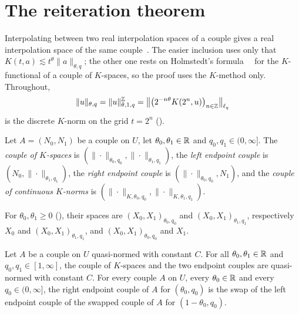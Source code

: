\section{The reiteration theorem}
\label{sec:reiteration}

Interpolating between two real interpolation spaces of a couple gives a real interpolation
space of the same couple~\cite[Theorems~3.5.3 and~3.11.5]{BerghLofstrom}. The easier inclusion
uses only that $K(t, a) \lesssim t^{\theta} \|a\|_{\theta, q}$; the other one rests on
Holmstedt's formula~\cite{Holmstedt}~\cite[Theorem~3.6.1]{BerghLofstrom} for the $K$-functional
of a couple of $K$-spaces, so the proof uses the $K$-method only. Throughout,
\[
  \|u\|_{\theta, q} = \|u\|^{\mathbb{Z}}_{\theta, 1, q}
  = \bigl\| \bigl(2^{-n\theta} K(2^n, u)\bigr)_{n \in \mathbb{Z}} \bigr\|_{\ell_q}
\]
is the discrete $K$-norm on the grid $t = 2^n$ ().

\begin{definition}
\label{def:k-space-couples}
\leanok
{}
Let $A = (N_0, N_1)$ be a couple on $U$, let $\theta_0, \theta_1 \in \mathbb{R}$ and
$q_0, q_1 \in (0, \infty]$. The \emph{couple of $K$-spaces} is
$(\|\cdot\|_{\theta_0, q_0}, \|\cdot\|_{\theta_1, q_1})$, the \emph{left endpoint couple} is
$(N_0, \|\cdot\|_{\theta_1, q_1})$, the \emph{right endpoint couple} is
$(\|\cdot\|_{\theta_0, q_0}, N_1)$, and the \emph{couple of continuous $K$-norms} is
$(\|\cdot\|_{K, \theta_0, q_0}, \|\cdot\|_{K, \theta_1, q_1})$.
\end{definition}

For $\theta_0, \theta_1 \geq 0$ (), their spaces are
$(X_0, X_1)_{\theta_0, q_0}$ and $(X_0, X_1)_{\theta_1, q_1}$, respectively
$X_0$ and $(X_0, X_1)_{\theta_1, q_1}$, and $(X_0, X_1)_{\theta_0, q_0}$ and $X_1$.

\begin{lemma}
\label{lem:k-space-couples}
\leanok
{}
Let $A$ be a couple on $U$ quasi-normed with constant $C$. For all $\theta_0, \theta_1 \in \mathbb{R}$
and $q_0, q_1 \in [1, \infty]$, the couple of $K$-spaces and the two endpoint couples are
quasi-normed with constant $C$. For every couple $A$ on $U$, every $\theta_0 \in \mathbb{R}$ and every
$q_0 \in (0, \infty]$, the right endpoint couple of $A$ for $(\theta_0, q_0)$ is the swap of the
left endpoint couple of the swapped couple of $A$ for $(1 - \theta_0, q_0)$.
\end{lemma}


